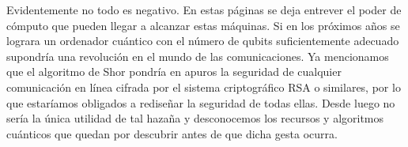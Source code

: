 Evidentemente no todo es negativo. En estas páginas se deja entrever el poder de cómputo que pueden llegar a alcanzar estas máquinas. Si en los próximos años se lograra un ordenador cuántico con el número de qubits suficientemente adecuado supondría una revolución en el mundo de las comunicaciones. Ya mencionamos que el algoritmo de Shor pondría en apuros la seguridad de cualquier comunicación en línea cifrada por el sistema criptográfico RSA o similares, por lo que estaríamos obligados a rediseñar la seguridad de todas ellas. Desde luego no sería la única utilidad de tal hazaña y desconocemos los recursos y algoritmos cuánticos que quedan por descubrir antes de que dicha gesta ocurra.